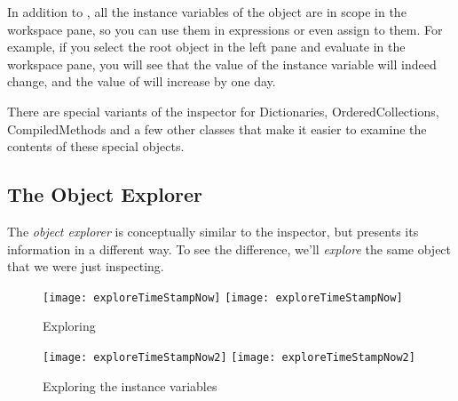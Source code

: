 \documentclass[a4paper,10pt,twoside]{book}
\begin{document}
In addition to , all the instance variables of the object are in scope in the workspace pane, so you can use them in expressions or even assign to them.  For example, if you select the root object in the left pane and evaluate  in the workspace pane, you will see that the value of the  instance variable will indeed change, and the value of  will increase by one day.


There are special variants of the inspector for Dictionaries, OrderedCollections, CompiledMethods and a few other classes that make it easier to examine the contents of these special objects.

\subsection{The Object Explorer}

The \emph{object explorer} is conceptually similar to the inspector, but presents its information in a different way.
To see the difference, we'll \emph{explore} the same object that we were just inspecting.

\begin{figure}[tbp]
\begin{minipage}{0.48\textwidth}
	\begin{center}
	\ifluluelse
		{\texttt{[image: exploreTimeStampNow]}}
		{\texttt{[image: exploreTimeStampNow]}}
	\end{center}
	\caption{Exploring }
\end{minipage}
\hfill
\begin{minipage}{0.48\textwidth}
	\begin{center}
	\ifluluelse
		{\texttt{[image: exploreTimeStampNow2]}}
		{\texttt{[image: exploreTimeStampNow2]}}
	\end{center}
	\caption{Exploring the instance variables}
\end{minipage}
\end{figure}
\end{document}
